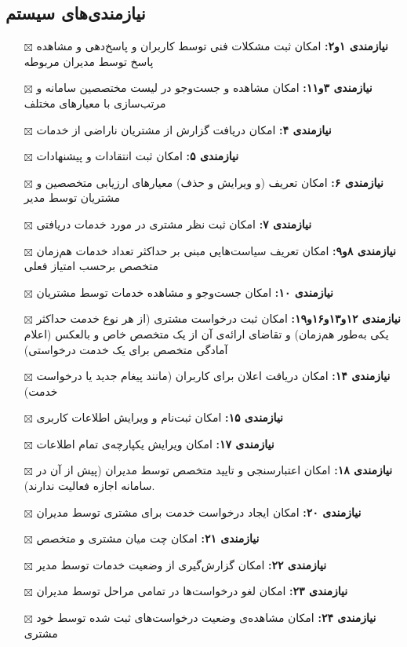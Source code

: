 \subsection{\hspace*{0.2cm} نیازمندی‌های سیستم}
\begin{itemize} \setlength\itemsep{0cm}
	\item[$\boxtimes$] \textbf{نیازمندی ۱و۲:}
	امکان ثبت مشکلات فنی توسط کاربران و پاسخ‌دهی و مشاهده پاسخ توسط مدیران مربوطه
	\item[$\boxtimes$] \textbf{نیازمندی ۳و۱۱:}
	امکان مشاهده و جست‌وجو در لیست مختصصین سامانه و مرتب‌سازی با معیارهای مختلف
	\item[$\boxtimes$] \textbf{نیازمندی ۴:}
	امکان دریافت گزارش از مشتریان ناراضی از خدمات
	\item[$\boxtimes$] \textbf{نیازمندی ۵:}
	امکان ثبت انتقادات و پیشنهادات
	\item[$\boxtimes$] \textbf{نیازمندی ۶:}
	امکان تعریف (و ویرایش و حذف) معیارهای ارزیابی متخصصین و مشتریان توسط مدیر
	\item[$\boxtimes$] \textbf{نیازمندی ۷:}
	امکان ثبت نظر مشتری در مورد خدمات دریافتی
	\item[$\boxtimes$] \textbf{نیازمندی ۸و۹:}
	امکان تعریف سیاست‌هایی مبنی بر حداکثر تعداد خدمات هم‌زمان متخصص برحسب امتیاز فعلی
	\item[$\boxtimes$] \textbf{نیازمندی ۱۰:}
	امکان جست‌وجو و مشاهده خدمات توسط مشتریان
	\item[$\boxtimes$] \textbf{نیازمندی ۱۲و۱۳و۱۶و۱۹:}
	امکان ثبت درخواست مشتری (از هر نوع خدمت حداکثر یکی به‌طور هم‌زمان) و تقاضای ارائه‌ی آن از یک متخصص خاص و بالعکس (اعلام آمادگی متخصص برای یک خدمت درخواستی)
	\item[$\boxtimes$] \textbf{نیازمندی ۱۴:}
	امکان دریافت اعلان برای کاربران (مانند پیغام جدید یا درخواست خدمت)
	\item[$\boxtimes$] \textbf{نیازمندی ۱۵:}
	امکان ثبت‌نام و ویرایش اطلاعات کاربری
	\item[$\boxtimes$] \textbf{نیازمندی ۱۷:}
	امکان ویرایش یکپارچه‌ی تمام اطلاعات
	\item[$\boxtimes$] \textbf{نیازمندی ۱۸:}
	امکان اعتبارسنجی و تایید متخصص توسط مدیران (پیش از آن در سامانه اجازه فعالیت ندارند).
	\item[$\boxtimes$] \textbf{نیازمندی ۲۰:}
	امکان ایجاد درخواست خدمت برای مشتری توسط مدیران
	\item[$\boxtimes$] \textbf{نیازمندی ۲۱:}
	امکان چت میان مشتری و متخصص
	\item[$\boxtimes$] \textbf{نیازمندی ۲۲:}
	امکان گزارش‌گیری از وضعیت خدمات توسط مدیر
	\item[$\boxtimes$] \textbf{نیازمندی ۲۳:}
	امکان لغو درخواست‌ها در تمامی مراحل توسط مدیران
	\item[$\boxtimes$] \textbf{نیازمندی ۲۴:}
	امکان مشاهده‌ی وضعیت درخواست‌های ثبت شده توسط خود مشتری
\end{itemize}

